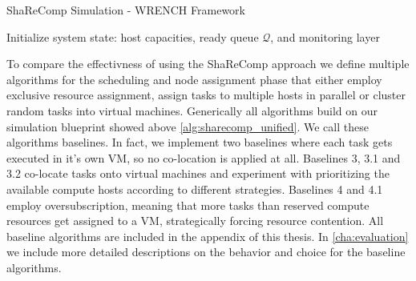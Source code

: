 \begin{algorithm}[H]
    \caption{ShaReComp Simulation - WRENCH Framework}
    \label{alg:sharecomp_unified}

    \BlankLine
    Initialize system state: host capacities, ready queue \( \mathcal{Q} \), and monitoring layer\\

\end{algorithm}

To compare the effectivness of using the ShaReComp approach we define multiple algorithms for the scheduling and node assignment phase that either employ exclusive resource assignment, assign tasks to multiple hosts in parallel or cluster random tasks into virtual machines. Generically all algorithms build on our simulation blueprint showed above \ref{alg:sharecomp_unified}. We call these algorithms baselines. In fact, we implement two baselines where each task gets executed in it's own VM, so no co-location is applied at all. Baselines 3, 3.1 and 3.2 co-locate tasks onto virtual machines and experiment with prioritizing the available compute hosts according to different strategies. Baselines 4 and 4.1 employ oversubscription, meaning that more tasks than reserved compute resources get assigned to a VM, strategically forcing resource contention. All baseline algorithms are included in the appendix of this thesis. In \ref{cha:evaluation} we include more detailed descriptions on the behavior and choice for the baseline algorithms.

